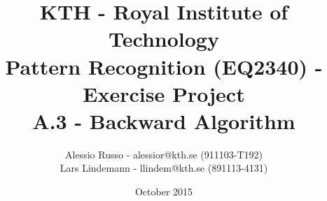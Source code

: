 \documentclass[10pt,a4paper,final]{article}
\author{Alessio Russo - alessior@kth.se (911103-T192) \\ Lars Lindemann - llindem@kth.se (891113-4131)}
\title{KTH - Royal Institute of Technology \\ \Large{Pattern Recognition (EQ2340) - Exercise Project }\\ A.3 - Backward Algorithm}
\date{October 2015}
\begin{document}
\maketitle
\tableofcontents


\clearpage

\pagebreak

\end{document}
